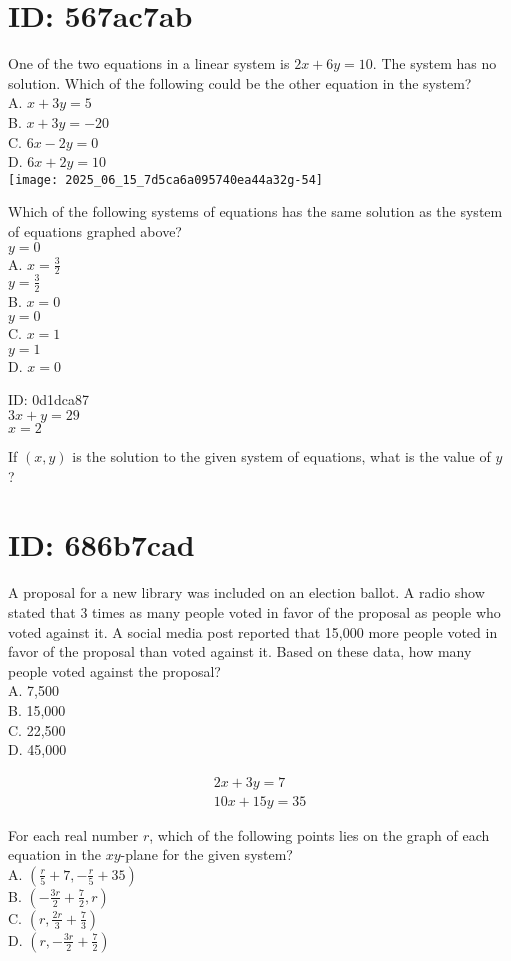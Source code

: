 \section*{ID: 567ac7ab}
One of the two equations in a linear system is $2 x+6 y=10$. The system has no solution. Which of the following could be the other equation in the system?\\
A. $x+3 y=5$\\
B. $x+3 y=-20$\\
C. $6 x-2 y=0$\\
D. $6 x+2 y=10$\\
\texttt{[image: 2025\_06\_15\_7d5ca6a095740ea44a32g-54]}

Which of the following systems of equations has the same solution as the system of equations graphed above?\\
$y=0$\\
A. $x=\frac{3}{2}$\\
$y=\frac{3}{2}$\\
B. $x=0$\\
$y=0$\\
C. $x=1$\\
$y=1$\\
D. $x=0$

ID: 0d1dca87\\
$3 x+y=29$\\
$x=2$

If $(x, y)$ is the solution to the given system of equations, what is the value of $y$ ?

\section*{ID: 686b7cad}
A proposal for a new library was included on an election ballot. A radio show stated that 3 times as many people voted in favor of the proposal as people who voted against it. A social media post reported that 15,000 more people voted in favor of the proposal than voted against it. Based on these data, how many people voted against the proposal?\\
A. 7,500\\
B. 15,000\\
C. 22,500\\
D. 45,000

$$
\begin{gathered}
2 x+3 y=7 \\
10 x+15 y=35
\end{gathered}
$$

For each real number $r$, which of the following points lies on the graph of each equation in the $x y$-plane for the given system?\\
A. $\left(\frac{r}{5}+7,-\frac{r}{5}+35\right)$\\
B. $\left(-\frac{3 r}{2}+\frac{7}{2}, r\right)$\\
C. $\left(r, \frac{2 r}{3}+\frac{7}{3}\right)$\\
D. $\left(r,-\frac{3 r}{2}+\frac{7}{2}\right)$

